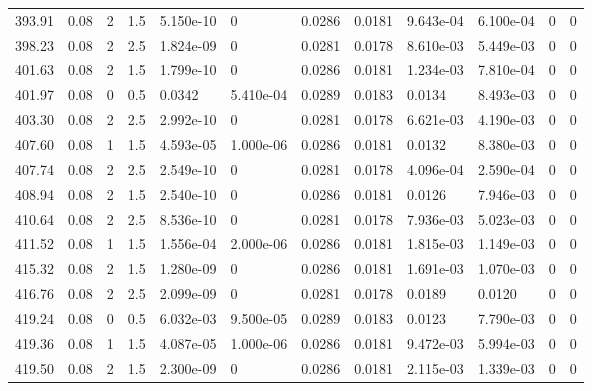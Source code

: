 \documentclass[preview]{standalone}
\begin{document}
{{{{{{\begin{tabular}{L{1.2cm}C{1.2cm} C{0.3cm}C{0.5cm} C{1.4cm}C{1.4cm} C{1.4cm}C{1.4cm} C{1.6cm}C{1.6cm} C{1.6cm}C{1.6cm}}
  393.91  &  0.08  & 2     & 1.5 &  5.150e-10  & 0  &  0.0286&   0.0181& 9.643e-04 & 6.100e-04   &  0 & 0  \\ 
  398.23  &  0.08  & 2     & 2.5 &  1.824e-09  & 0  &  0.0281&   0.0178& 8.610e-03 & 5.449e-03   &  0 & 0  \\ 
  401.63  &  0.08  & 2     & 1.5 &  1.799e-10  & 0  &  0.0286&   0.0181& 1.234e-03 & 7.810e-04   &  0 & 0  \\ 
  401.97  &  0.08  & 0     & 0.5 &  0.0342  & 5.410e-04  &  0.0289&   0.0183& 0.0134 & 8.493e-03   &  0 & 0  \\ 
  403.30  &  0.08  & 2     & 2.5 &  2.992e-10  & 0  &  0.0281&   0.0178& 6.621e-03 & 4.190e-03   &  0 & 0  \\ 
  407.60  &  0.08  & 1     & 1.5 &  4.593e-05  & 1.000e-06  &  0.0286&   0.0181& 0.0132 & 8.380e-03   &  0 & 0  \\ 
  407.74  &  0.08  & 2     & 2.5 &  2.549e-10  & 0  &  0.0281&   0.0178& 4.096e-04 & 2.590e-04   &  0 & 0  \\ 
  408.94  &  0.08  & 2     & 1.5 &  2.540e-10  & 0  &  0.0286&   0.0181& 0.0126 & 7.946e-03   &  0 & 0  \\ 
  410.64  &  0.08  & 2     & 2.5 &  8.536e-10  & 0  &  0.0281&   0.0178& 7.936e-03 & 5.023e-03   &  0 & 0  \\ 
  411.52  &  0.08  & 1     & 1.5 &  1.556e-04  & 2.000e-06  &  0.0286&   0.0181& 1.815e-03 & 1.149e-03   &  0 & 0  \\ 
  415.32  &  0.08  & 2     & 1.5 &  1.280e-09  & 0  &  0.0286&   0.0181& 1.691e-03 & 1.070e-03   &  0 & 0  \\ 
  416.76  &  0.08  & 2     & 2.5 &  2.099e-09  & 0  &  0.0281&   0.0178& 0.0189 & 0.0120   &  0 & 0  \\ 
  419.24  &  0.08  & 0     & 0.5 &  6.032e-03  & 9.500e-05  &  0.0289&   0.0183& 0.0123 & 7.790e-03   &  0 & 0  \\ 
  419.36  &  0.08  & 1     & 1.5 &  4.087e-05  & 1.000e-06  &  0.0286&   0.0181& 9.472e-03 & 5.994e-03   &  0 & 0  \\ 
  419.50  &  0.08  & 2     & 1.5 &  2.300e-09  & 0  &  0.0286&   0.0181& 2.115e-03 & 1.339e-03   &  0 & 0  \\ 
\hline 
\end{tabular} 

}}}}}}
\end{document}
